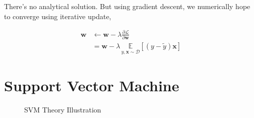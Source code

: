 \documentclass[11pt]{article}
\begin{document}
There’s no analytical solution.  But using gradient
descent, we numerically hope to converge using
iterative update,

\begin{align*}
  \mathbf{w} &\gets \mathbf{w} -\lambda \frac {\partial
               \mathcal{L}} {\partial \mathbf{w}} \\
  &= \mathbf{w} -\lambda \, \underset{y, \mathbf{x}
    \sim \mathcal{D}} {\mathbb{E}} \left[
    (y-\widetilde{y}) \mathbf{x} \right] 
\end{align*}

\section{Support Vector Machine}
\label{sec:orgcd7d461}

\begin{figure}[!h]
\LARGE
\centering
\def\svgwidth{0.8\linewidth}

\caption{SVM Theory Illustration}
\end{figure}
\end{document}

